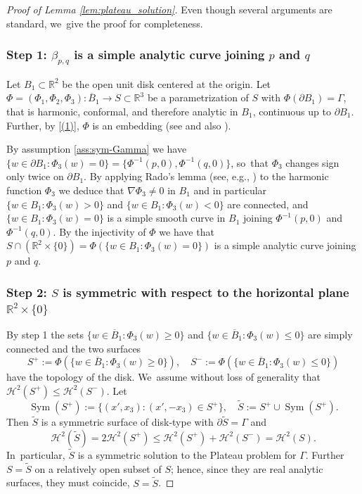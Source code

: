 \documentclass[11pt]{article}
\numberwithin{equation}{section}
\DeclareMathOperator{\Sym}{Sym}
\newcommand{\R}{\mathbb{R}}
\theoremstyle{definition}
\begin{document}
\begin{proof}[Proof of Lemma \ref{lem:plateau_solution}]
Even though several arguments are
standard, we~give the proof for completeness.

\subsubsection*{Step 1: $\beta_{p,q}$ is a simple analytic curve joining $p$ and $q$}
Let $B_1\subset\R^2$ be the open unit disk centered at the origin. Let $\Phi=(\Phi_1,\Phi_2,\Phi_3)\colon\overline{B}_1\to S\subset\R^3$
be a parametrization of $S$ with $\Phi(\partial B_1)=\Gamma$,
that is harmonic, conformal, and therefore analytic in $B_1$, continuous up to $\partial B_1$.
Further, by \ref{(1)},
$\Phi$ is an embedding (see \cite{MY} and also \cite[p.\,343]{DHS}).

By assumption \eqref{ass:sym-Gamma} we have $\{w\in\partial B_1\colon\Phi_3(w)=0\}=\{\Phi^{-1}(p,0),\Phi^{-1}(q,0)\}$, so~that $\Phi_3$ changes sign only twice on $\partial B_1$. By applying Rado's lemma (see, e.g., \cite[Lem.\,2, p.\,295]{DHS}) to the harmonic function $\Phi_3$ we deduce that $\nabla\Phi_3\ne0$ in $B_1$ and in particular $\{w\in B_1\colon\Phi_3(w)>0\}$ and $\{w\in B_1\colon\Phi_3(w)<0\}$
are connected, and $\{w\in B_1\colon\Phi_3(w)=0\}$ is a simple smooth curve in $B_1$ joining $\Phi^{-1}(p,0)$ and $\Phi^{-1}(q,0)$.
By the injectivity of $\Phi$ we have that $S\cap(\R^2\times\{0\})=\Phi(\{w\in B_1\colon\Phi_3(w)=0\})$ is a simple analytic curve joining $p$ and $q$.

\subsubsection*{Step 2: $S$ is symmetric with respect to the horizontal plane $\R^2\times\{0\}$}
By step 1 the sets $\{w\in \overline B_1\colon\Phi_3(w)\ge0\}$ and $\{w\in \overline B_1\colon\Phi_3(w)\le0\}$ are simply connected and the two surfaces
\[
S^+:=\Phi(\{w\in \overline B_1\colon\Phi_3(w)\ge0\}),\quad S^-:=\Phi(\{w\in \overline B_1\colon\Phi_3(w)\le0\})
\]
have the topology of the disk. We~assume without loss of generality that $\mathcal{H}^2(S^+)\le \mathcal{H}^2(S^-)$. Let
\[
\Sym(S^+):=\{(x',x_3)\colon (x',-x_3)\in S^+\},\quad \widetilde S:= S^+\cup\Sym(S^+).
\]
Then $\widetilde S$ is a symmetric surface of disk-type with $\partial\widetilde S =\Gamma$ and
\begin{equation*}
\mathcal{H}^2(\widetilde S)=2\mathcal{H}^2(S^+)\le\mathcal{H}^2(S^+)+\mathcal{H}^2(S^-)=\mathcal{H}^2(S).
\end{equation*}
In~particular, $\widetilde S$ is a symmetric solution to the
Plateau problem for $\Gamma$. Further $S=\widetilde S$ on a relatively
open subset of $S$; hence, since they are real
analytic surfaces, they must coincide, $S=\widetilde S$.


\end{proof}
\end{document}
